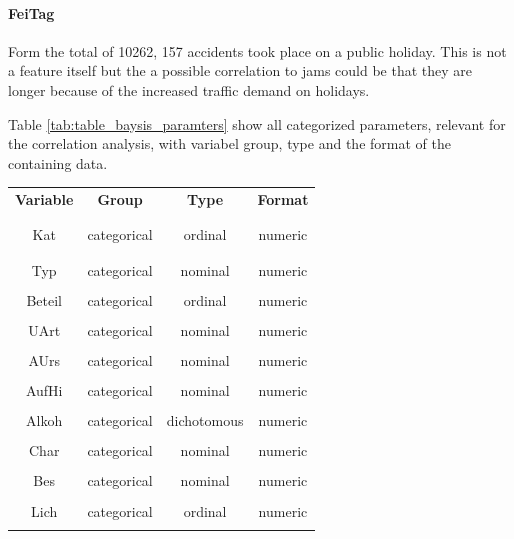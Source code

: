 \documentclass[a4paper,12pt]{report}
\begin{document}
\paragraph{FeiTag}
Form the total of 10262, 157 accidents took place on a public holiday. This is not a feature itself but the a possible correlation to jams could be that they are longer because of the increased traffic demand on holidays.

\bigskip

\bigskip

Table \ref{tab:table_baysis_paramters} show all categorized parameters, relevant for the correlation analysis, with variabel group, type and the format of the containing data.
	
\begin{table}[ht]
	\centering
	\begin{tabular}{c|c|c|c}
		\textbf{Variable} 	& \textbf{Group} 	& \textbf{Type} 		& \textbf{Format} \\
		\\[-1em]
		\hline
		\\[-1em]
		Kat  		& categorical 	& ordinal 	& numeric\\
		\\[-1em]
		\hline
		\\[-1em]
		Typ 		& categorical 	& nominal	& numeric\\
		\hline
		\\[-1em]
		Beteil 		& categorical 	& ordinal	& numeric\\
		\hline
		\\[-1em]
		UArt 		& categorical 	& nominal	& numeric\\
		\hline
		\\[-1em]
		AUrs 		& categorical 	& nominal	& numeric\\
		\hline
		\\[-1em]
		AufHi 		& categorical 	& nominal	& numeric\\
		\hline
		\\[-1em]
		Alkoh 		& categorical 	& dichotomous	& numeric\\
		\hline
		\\[-1em]
		Char 		& categorical 	& nominal	& numeric\\
		\hline
		\\[-1em]
		Bes 		& categorical 	& nominal	& numeric\\
		\hline
		\\[-1em]
		Lich 		& categorical 	& ordinal	& numeric\\
		\hline
		\\[-1em]

\end{tabular}
\end{table}
\end{document}
